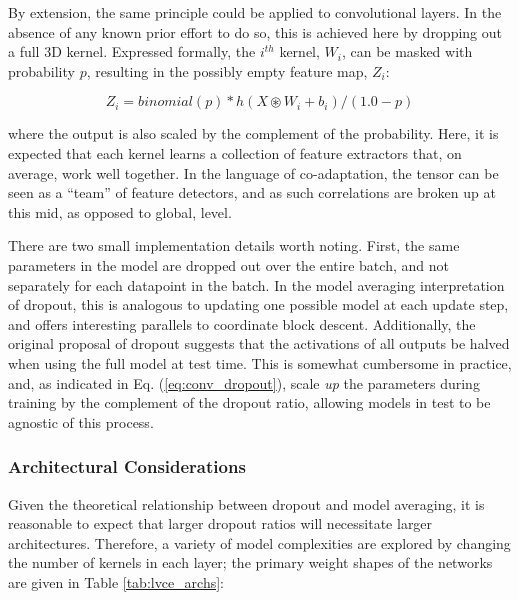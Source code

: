 By extension, the same principle could be applied to convolutional layers.
In the absence of any known prior effort to do so, this is achieved here by dropping out a full 3D kernel.
Expressed formally, the $i^{th}$ kernel, $W_i$, can be masked with probability $p$, resulting in the possibly empty feature map, $Z_i$:

\begin{equation}
\label{eq:conv_dropout}
Z_i = binomial(p) * h(X \circledast W_i + b_i) / (1.0 - p)
\end{equation}

\noindent where the output is also scaled by the complement of the probability.
Here, it is expected that each kernel learns a collection of feature extractors that, on average, work well together.
In the language of co-adaptation, the tensor can be seen as a ``team'' of feature detectors, and as such correlations are broken up at this mid, as opposed to global, level.

There are two small implementation details worth noting.
First, the same parameters in the model are dropped out over the entire batch, and not separately for each datapoint in the batch.
In the model averaging interpretation of dropout, this is analogous to updating one possible model at each update step, and offers interesting parallels to coordinate block descent.
Additionally, the original proposal of dropout suggests that the activations of all outputs be halved when using the full model at test time.
This is somewhat cumbersome in practice, and, as indicated in Eq. (\ref{eq:conv_dropout}), scale \emph{up} the parameters during training by the complement of the dropout ratio, allowing models in test to be agnostic of this process.


\subsubsection{Architectural Considerations}
\label{subsubsec:arch}

Given the theoretical relationship between dropout and model averaging, it is reasonable to expect that larger dropout ratios will necessitate larger architectures.
Therefore, a variety of model complexities are explored by changing the number of kernels in each layer; the primary weight shapes of the networks are given in Table \ref{tab:lvce_archs}:

